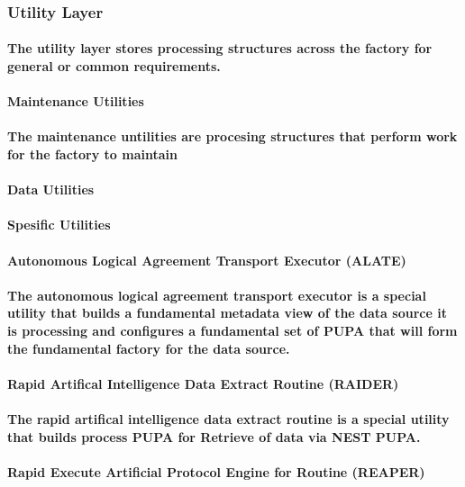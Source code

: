 \documentclass{acm_proc_article-sp}
\begin{document}
\subsubsection{Utility Layer}
\paragraph{The utility layer stores processing structures across the factory for general or common requirements.}
\paragraph{Maintenance Utilities}
\paragraph{The maintenance untilities are procesing structures that perform work for the factory to maintain}
\paragraph{Data Utilities}
\paragraph{Spesific Utilities}
\paragraph{\textbf{Autonomous Logical Agreement Transport Executor (ALATE)}}
\paragraph{The autonomous logical agreement transport executor is a special utility that builds a fundamental metadata view of the data source it is processing and configures a fundamental set of PUPA that will form the fundamental factory for the data source.}
\paragraph{\textbf{Rapid Artifical Intelligence Data Extract Routine (RAIDER)}}
\paragraph{The rapid artifical intelligence data extract routine is a special utility that builds process PUPA for Retrieve of data via NEST PUPA.}
\paragraph{\textbf{Rapid Execute Artificial Protocol Engine for Routine (REAPER)}}
\end{document}
